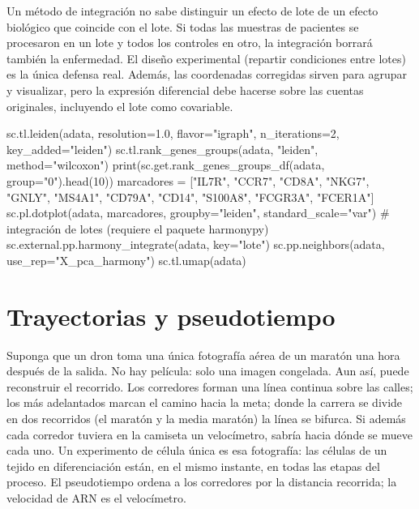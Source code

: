 \begin{cuidado}
Un método de integración no sabe distinguir un efecto de lote de un efecto biológico que coincide con el lote. Si todas las muestras de pacientes se procesaron en un lote y todos los controles en otro, la integración borrará también la enfermedad. El diseño experimental (repartir condiciones entre lotes) es la única defensa real. Además, las coordenadas corregidas sirven para agrupar y visualizar, pero la expresión diferencial debe hacerse sobre las cuentas originales, incluyendo el lote como covariable.
\end{cuidado}

\begin{codigo}[clustering.py]
sc.tl.leiden(adata, resolution=1.0, flavor="igraph",
             n_iterations=2, key_added="leiden")
sc.tl.rank_genes_groups(adata, "leiden", method="wilcoxon")
print(sc.get.rank_genes_groups_df(adata, group="0").head(10))
marcadores = ["IL7R", "CCR7", "CD8A", "NKG7", "GNLY", "MS4A1",
              "CD79A", "CD14", "S100A8", "FCGR3A", "FCER1A"]
sc.pl.dotplot(adata, marcadores, groupby="leiden",
              standard_scale="var")
# integración de lotes (requiere el paquete harmonypy)
sc.external.pp.harmony_integrate(adata, key="lote")
sc.pp.neighbors(adata, use_rep="X_pca_harmony")
sc.tl.umap(adata)
\end{codigo}

\section{Trayectorias y pseudotiempo}\label{sec:12-trayectorias}

\begin{intuicion}
Suponga que un dron toma una única fotografía aérea de un maratón una hora después de la salida. No hay película: solo una imagen congelada. Aun así, puede reconstruir el recorrido. Los corredores forman una línea continua sobre las calles; los más adelantados marcan el camino hacia la meta; donde la carrera se divide en dos recorridos (el maratón y la media maratón) la línea se bifurca. Si además cada corredor tuviera en la camiseta un velocímetro, sabría hacia dónde se mueve cada uno. Un experimento de célula única es esa fotografía: las células de un tejido en diferenciación están, en el mismo instante, en todas las etapas del proceso. El pseudotiempo ordena a los corredores por la distancia recorrida; la velocidad de ARN es el velocímetro.
\end{intuicion}

